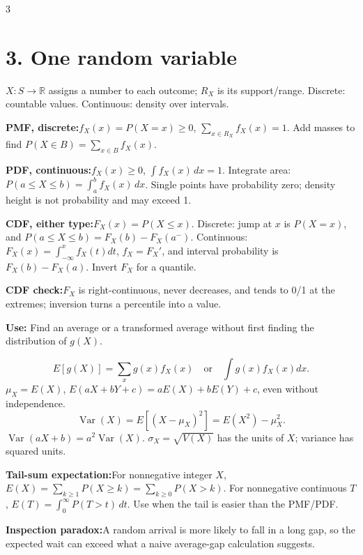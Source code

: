 \documentclass[10pt,a4paper,landscape]{article}
\newcommand{\CheatNote}[2]{\par\noindent\textcolor{cueorange}{\textbf{#1:}}\;#2\par}
\newcommand{\Use}[1]{\textcolor{cueorange}{\textbf{Use:}} #1\par}
\begin{document}
\begin{multicols}{3}
\section*{3. One random variable}
\(X:S\to\mathbb R\) assigns a number to each outcome; \(R_X\) is its support/range. Discrete: countable values. Continuous: density over intervals.
\CheatNote{PMF, discrete}{\(f_X(x)=P(X=x)\ge0\), \(\sum_{x\in R_X}f_X(x)=1\). Add masses to find \(P(X\in B)=\sum_{x\in B}f_X(x)\).}
\CheatNote{PDF, continuous}{\(f_X(x)\ge0\), \(\int f_X(x)\,dx=1\). Integrate area: \(P(a\le X\le b)=\int_a^b f_X(x)\,dx\). Single points have probability zero; density height is not probability and may exceed 1.}
\CheatNote{CDF, either type}{\(F_X(x)=P(X\le x)\). Discrete: jump at \(x\) is \(P(X=x)\), and \(P(a\le X\le b)=F_X(b)-F_X(a^-)\). Continuous: \(F_X(x)=\int_{-\infty}^x f_X(t)dt\), \(f_X=F_X'\), and interval probability is \(F_X(b)-F_X(a)\). Invert \(F_X\) for a quantile.}
\CheatNote{CDF check}{\(F_X\) is right-continuous, never decreases, and tends to 0/1 at the extremes; inversion turns a percentile into a value.}
\Use{Find an average or a transformed average without first finding the distribution of \(g(X)\).}
\[E[g(X)]=\sum_x g(x)f_X(x)\quad\text{or}\quad\int g(x)f_X(x)dx.\]
\(\mu_X=E(X)\), \(E(aX+bY+c)=aE(X)+bE(Y)+c\), even without independence.
\[\operatorname{Var}(X)=E[(X-\mu_X)^2]=E(X^2)-\mu_X^2.\]
\(\operatorname{Var}(aX+b)=a^2\operatorname{Var}(X)\). \(\sigma_X=\sqrt{V(X)}\) has the units of \(X\); variance has squared units.
\CheatNote{Tail-sum expectation}{For nonnegative integer \(X\), \(E(X)=\sum_{k\ge1}P(X\ge k)=\sum_{k\ge0}P(X>k)\). For nonnegative continuous \(T\), \(E(T)=\int_0^\infty P(T>t)\,dt\). Use when the tail is easier than the PMF/PDF.}
\CheatNote{Inspection paradox}{A random arrival is more likely to fall in a long gap, so the expected wait can exceed what a naive average-gap calculation suggests.}


\end{multicols}
\end{document}
